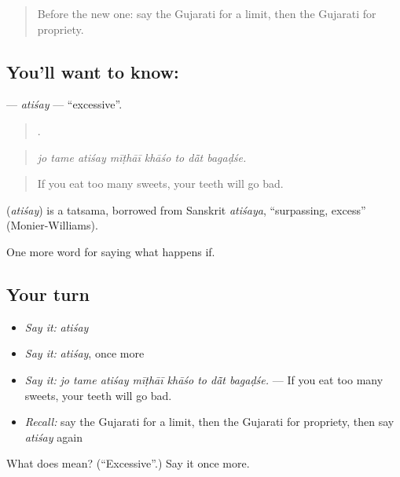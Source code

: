 \begin{quote}
Before the new one: say the Gujarati for a limit, then the Gujarati for propriety.
\end{quote}

\subsection*{You'll want to know: }
\textbf{} — \emph{atiśay} — \textquotedblleft{}excessive\textquotedblright{}.

\begin{quote}
       .
\end{quote}

\begin{quote}
\emph{jo tame atiśay mīṭhāī khāśo to dā̃t bagaḍśe.}
\end{quote}

\begin{quote}
If you eat too many sweets, your teeth will go bad.
\end{quote}

\begin{cousinweb}
\textbf{} (\emph{atiśay}) is a tatsama, borrowed from Sanskrit \emph{atiśaya}, \textquotedblleft{}surpassing, excess\textquotedblright{} (Monier-Williams).
\end{cousinweb}

\begin{grammarlens}[title={What you've built}]
One more word for saying what happens if.
\end{grammarlens}

\subsection*{Your turn}
\begin{itemize}
\raggedright
  \item \emph{Say it:} \emph{atiśay}
  \item \emph{Say it:} \emph{atiśay}, once more
  \item \emph{Say it:} \emph{jo tame atiśay mīṭhāī khāśo to dā̃t bagaḍśe.} — If you eat too many sweets, your teeth will go bad.
  \item \emph{Recall:} say the Gujarati for a limit, then the Gujarati for propriety, then say \emph{atiśay} again
\end{itemize}

\begin{tcolorbox}[breakable,colback=teal!4,colframe=teal!35!black,title={Before you move on}]
What does  mean? (\textquotedblleft{}Excessive\textquotedblright{}.) Say it once more.
\end{tcolorbox}
